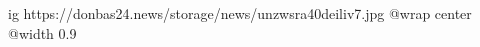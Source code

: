  
 
 
 
 

\ifcmt
  ig https://donbas24.news/storage/news/unzwsra40deiliv7.jpg
  @wrap center
  @width 0.9
\fi
